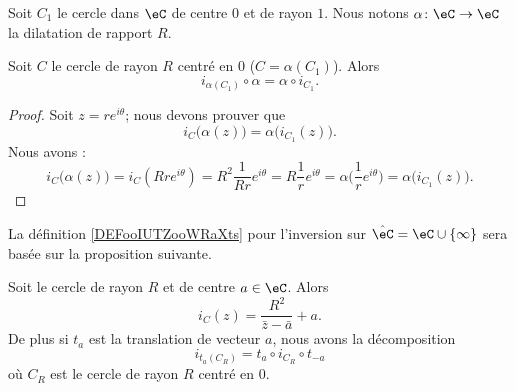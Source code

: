 Soit \( C_1\) le cercle dans \( \eC\) de centre \( 0\) et de rayon \( 1\). Nous notons \( \alpha\colon \eC\to \eC\) la dilatation de rapport \( R\).

\begin{proposition}          \label{PROPooYHQVooVFamhr}
    Soit \( C\) le cercle de rayon \( R\) centré en \( 0\) (\( C=\alpha(C_1)\)). Alors
    \begin{equation}
        i_{\alpha(C_1)}\circ \alpha=\alpha\circ i_{C_1}.
    \end{equation}
\end{proposition}

\begin{proof}
    Soit \( z=r e^{i\theta}\); nous devons prouver que 
    \begin{equation}
        i_C\big( \alpha(z) \big)=\alpha\big( i_{C_1}(z) \big).
    \end{equation}
    Nous avons :
    \begin{equation}
            i_C\big( \alpha(z) \big)=i_C(Rr e^{i\theta})=R^2\frac{1}{ Rr } e^{i\theta}=R\frac{1}{ r } e^{i\theta}=\alpha\big( \frac{1}{ r } e^{i\theta} \big)=\alpha\big( i_{C_1}(z) \big).
    \end{equation}
\end{proof}

La définition \ref{DEFooIUTZooWRaXts} pour l'inversion sur \( \hat \eC=\eC\cup\{ \infty \}\) sera basée sur la proposition suivante.
\begin{proposition}      \label{PROPooEWXNooNshvHq}
    Soit le cercle de rayon \( R\) et de centre \( a\in \eC\). Alors 
    \begin{equation}        \label{EQooEQEFooHtJuje}
        i_C(z)=\frac{ R^2 }{ \bar z-\bar a }+a.
    \end{equation}
    De plus si \( t_a\) est la translation de vecteur \( a\), nous avons la décomposition
    \begin{equation}
        i_{t_a(C_R)}=t_a\circ i_{C_R}\circ t_{-a}
    \end{equation}
    où \( C_R\) est le cercle de rayon \( R\) centré en \( 0\).
\end{proposition}

